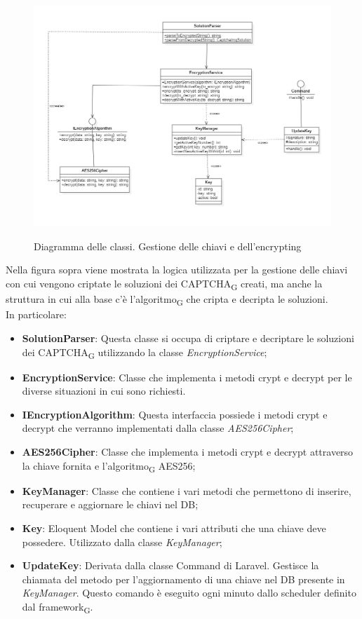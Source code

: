 \newpage


\begin{figure}[H]
	\centering
	\includegraphics[scale = 0.55]{img/key_manager.png}\\
	\caption{Diagramma delle classi. Gestione delle chiavi e dell'encrypting}
\end{figure}

Nella figura sopra viene mostrata la logica utilizzata per la gestione delle chiavi con cui vengono criptate le soluzioni dei CAPTCHA\textsubscript{G} creati, ma anche la struttura in cui alla base c'è l'algoritmo\textsubscript{G} che cripta e decripta le soluzioni.\\
In particolare:
\begin{itemize}
	\item \textbf{SolutionParser}: Questa classe si occupa di criptare e decriptare le soluzioni dei CAPTCHA\textsubscript{G} utilizzando la classe \textit{EncryptionService};
	\item \textbf{EncryptionService}: Classe che implementa i metodi crypt e decrypt per le diverse situazioni in cui sono richiesti.
	\item \textbf{IEncryptionAlgorithm}: Questa interfaccia possiede i metodi crypt e decrypt che verranno implementati dalla classe \textit{AES256Cipher}; 
	\item \textbf{AES256Cipher}: Classe che implementa i metodi crypt e decrypt attraverso la chiave fornita e l'algoritmo\textsubscript{G} AES256;
	\item \textbf{KeyManager}: Classe che contiene i vari metodi che permettono di inserire, recuperare e aggiornare le chiavi nel DB;
	\item \textbf{Key}: Eloquent Model che contiene i vari attributi che una chiave deve possedere. Utilizzato dalla classe \textit{KeyManager};
	\item \textbf{UpdateKey}: Derivata dalla classe Command di Laravel. Gestisce la chiamata del metodo per l'aggiornamento di una chiave nel DB presente in \textit{KeyManager}. Questo comando è eseguito ogni minuto dallo scheduler definito dal framework\textsubscript{G}.
\end{itemize}

